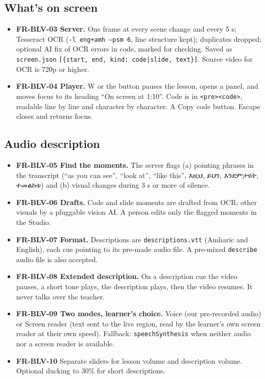 \documentclass[11pt,a4paper]{article}
\newcommand{\am}[1]{{\ethfont #1}}
\newcommand{\code}[1]{\texttt{#1}}
\newcommand{\req}[1]{\textbf{#1}}
\begin{document}
\subsection{What's on screen}
\begin{itemize}
  \item \req{FR-BLV-03 Server.} One frame at every scene change and every 5 s; Tesseract OCR (\code{-l eng+amh --psm 6}, line structure kept); duplicates dropped; optional AI fix of OCR errors in code, marked for checking. Saved as \code{screen.json} \code{[\{start, end, kind: code|slide, text\}]}. Source video for OCR is 720p or higher.
  \item \req{FR-BLV-04 Player.} W or the button pauses the lesson, opens a panel, and moves focus to its heading ``On screen at 1:10''. Code is in \code{<pre><code>}, readable line by line and character by character. A Copy code button. Escape closes and returns focus.
\end{itemize}

\subsection{Audio description}
\begin{itemize}
  \item \req{FR-BLV-05 Find the moments.} The server flags (a) pointing phrases in the transcript (``as you can see'', ``look at'', ``like this'', \am{እዚህ}, \am{ይህን}, \am{እንደምታዩት}, \am{ተመልከቱ}) and (b) visual changes during 3 s or more of silence.
  \item \req{FR-BLV-06 Drafts.} Code and slide moments are drafted from OCR; other visuals by a pluggable vision AI. A person edits only the flagged moments in the Studio.
  \item \req{FR-BLV-07 Format.} Descriptions are \code{descriptions.vtt} (Amharic and English), each cue pointing to its pre-made audio file. A pre-mixed \code{describe} audio file is also accepted.
  \item \req{FR-BLV-08 Extended description.} On a description cue the video pauses, a short tone plays, the description plays, then the video resumes. It never talks over the teacher.
  \item \req{FR-BLV-09 Two modes, learner's choice.} Voice (our pre-recorded audio) or Screen reader (text sent to the live region, read by the learner's own screen reader at their own speed). Fallback: \code{speechSynthesis} when neither audio nor a screen reader is available.
  \item \req{FR-BLV-10} Separate sliders for lesson volume and description volume. Optional ducking to 30\% for short descriptions.
\end{itemize}
\end{document}
